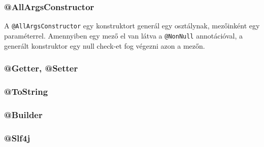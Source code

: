 \subsubsection{@AllArgsConstructor}

A \lstinline|@AllArgsConstructor| egy konstruktort generál egy osztálynak, mezőinként egy paraméterrel. Amennyiben egy mező el van látva a \lstinline|@NonNull| annotációval, a generált konstruktor egy null check-et fog végezni azon a mezőn.





\subsubsection{@Getter, @Setter}

\subsubsection{@ToString}

\subsubsection{@Builder}

\subsubsection{@Slf4j}




